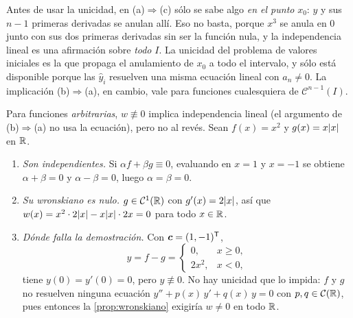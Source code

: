 \begin{idea}
Antes de usar la unicidad, en (a)$\Rightarrow$(c) sólo se sabe algo
\emph{en el punto} $x_0$: $y$ y sus $n-1$ primeras derivadas se anulan
allí. Eso no basta, porque $x^{3}$ se anula en $0$ junto con sus dos primeras derivadas sin
ser la función nula, y la independencia lineal es una afirmación sobre
\emph{todo} $I$. La unicidad del problema de valores iniciales es la que
propaga el anulamiento de $x_0$ a todo el intervalo, y sólo está disponible
porque las $\hat y_i$ resuelven una misma ecuación lineal con $a_n\neq0$.
La implicación (b)$\Rightarrow$(a), en cambio, vale para funciones
cualesquiera de $\mathcal C^{n-1}(I)$.
\end{idea}

\begin{observacion}\label{obs:wronskiano-general}
Para funciones \emph{arbitrarias}, $w\not\equiv0$ implica independencia
lineal (el argumento de (b)$\Rightarrow$(a) no usa la ecuación), pero no al
revés. Sean $f(x)=x^{2}$ y $g(x)=x\lvert x\rvert$ en $\mathbb{R}$.
\begin{enumerate}[label=(\roman*)]
  \item \emph{Son independientes.} Si $\alpha f+\beta g\equiv0$, evaluando
        en $x=1$ y $x=-1$ se obtiene $\alpha+\beta=0$ y $\alpha-\beta=0$, luego
        $\alpha=\beta=0$.
  \item \emph{Su wronskiano es nulo.} $g\in\mathcal C^{1}(\mathbb{R})$ con
        $g'(x)=2\lvert x\rvert$, así que
        $w(x)=x^{2}\cdot2\lvert x\rvert-x\lvert x\rvert\cdot2x=0$ para todo $x\in\mathbb{R}$.
  \item \emph{Dónde falla la demostración.} Con $\bm c=(1,-1)^{\mathsf{T}}$,
        \[
          y=f-g=\begin{cases}0, & x\ge0,\\ 2x^{2}, & x<0,\end{cases}
        \]
        tiene $y(0)=y'(0)=0$, pero $y\not\equiv0$. No hay unicidad que lo
        impida: $f$ y $g$ no resuelven ninguna ecuación
        $y''+p(x)\,y'+q(x)\,y=0$ con $p,q\in\mathcal C(\mathbb{R})$, pues entonces la
        \cref{prop:wronskiano} exigiría $w\neq0$ en todo $\mathbb{R}$.
\end{enumerate}
\end{observacion}

